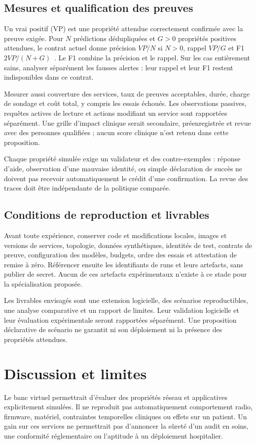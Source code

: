 \documentclass[11pt,a4paper]{article}
\begin{document}
\subsection{Mesures et qualification des preuves}
Un vrai positif (VP) est une propriété attendue correctement confirmée avec
la preuve exigée. Pour $N$ prédictions dédupliquées et $G>0$ propriétés positives
attendues, le contrat actuel donne précision $VP/N$ si $N>0$, rappel $VP/G$ et
F1 $2VP/(N+G)$~\cite{evaluation}. Le F1 combine la précision et le rappel.
Sur les cas entièrement sains, analyser séparément les fausses alertes : leur
rappel et leur F1 restent indisponibles dans ce contrat.

Mesurer aussi couverture des services, taux de preuves acceptables, durée,
charge de sondage et coût total, y compris les essais échoués. Les observations
passives, requêtes actives de lecture et actions modifiant un service sont
rapportées séparément. Une grille d'impact clinique serait secondaire,
préenregistrée et revue avec des personnes qualifiées ; aucun score clinique
n'est retenu dans cette proposition.

Chaque propriété simulée exige un validateur et des contre-exemples : réponse
d'aide, observation d'une mauvaise identité, ou simple déclaration de succès
ne doivent pas recevoir automatiquement le crédit d'une confirmation.
La revue des traces doit être indépendante de la politique comparée.

\subsection{Conditions de reproduction et livrables}
Avant toute expérience, conserver code et modifications locales, images et
versions de services, topologie, données synthétiques, identités de test,
contrats de preuve, configuration des modèles, budgets, ordre des essais et
attestation de remise à zéro. Référencer ensuite les identifiants de runs et
leurs artefacts, sans publier de secret. Aucun de ces artefacts expérimentaux
n'existe à ce stade pour la spécialisation proposée.

Les livrables envisagés sont une extension logicielle, des scénarios
reproductibles, une analyse comparative et un rapport de limites. Leur
validation logicielle et leur évaluation expérimentale seront rapportées
séparément. Une proposition déclarative de scénario ne garantit ni son
déploiement ni la présence des propriétés attendues.

\section{Discussion et limites}
Le banc virtuel permettrait d'évaluer des propriétés réseau et applicatives
explicitement simulées. Il ne reproduit pas automatiquement comportement radio,
firmware, matériel, contraintes temporelles cliniques ou effets sur un patient.
Un gain sur ces services ne permettrait pas d'annoncer la sûreté d'un audit en
soins, une conformité réglementaire ou l'aptitude à un déploiement hospitalier.
\end{document}
